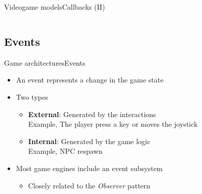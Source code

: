 \documentclass[10pt,compress]{beamer} %
\begin{document}
\begin{frame}{Videogame models}{Callbacks (II)}
	\vspace{-0.3cm}
    \begin{columns}
    		\begin{block}{}
	    	\vspace{-0.2cm}
	    	
			\vspace{-0.2cm}
			\end{block}
	\end{columns}
\end{frame}

\subsection{Events}
\begin{frame}{Game architectures}{Events}
	\begin{itemize}
		\item An event represents a change in the game state
		\item Two types
		\begin{itemize}
			\item \textbf{External}: Generated by the interactions\\Example, The player press a key or moves the joystick
			\item \textbf{Internal}: Generated by the game logic\\Example, NPC respawn
		\end{itemize}
		\item Most game engines include an event subsystem
		\begin{itemize}
			\item Closely related to the \textit{Observer} pattern
		\end{itemize}

	\end{itemize}
\end{frame}
\end{document}
